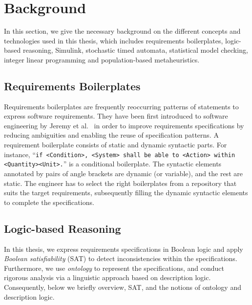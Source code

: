 \chapter{Background}
In this section, we give the necessary background on the different concepts and technologies used in this thesis, which includes requirements boilerplates, logic-based reasoning, Simulink, stochastic timed automata, statistical model checking, integer linear programming and population-based metaheuristics. 

\section{Requirements Boilerplates}
Requirements boilerplates are frequently reoccurring patterns of statements to express software requirements. They have been first introduced to software engineering by Jeremy et al.~\cite{Hull2011RequirementsEngineering} in order to improve requirements specifications by reducing ambiguities and enabling the reuse of specification patterns. A requirement boilerplate consists of static and dynamic syntactic parts. For instance, ``\texttt{if <Condition>, <System> shall be able to <Action> within <Quantity><Unit>.}'' is a conditional boilerplate.  The syntactic elements annotated by pairs of angle brackets are dynamic (or variable), and the rest are static. The engineer has to select the right boilerplates from a repository that suits the target requirements, subsequently filling the dynamic syntactic elements to complete the specifications. 

\section{Logic-based Reasoning}
In this thesis, we express requirements specifications in  Boolean logic and apply \textit{Boolean satisfiability} (SAT) to detect inconsistencies within the specifications. Furthermore, we use \textit{ontology} to represent the specifications, and conduct rigorous analysis via a linguistic approach based on description logic. Consequently, below we briefly overview, SAT, and the notions of ontology and description logic. 

